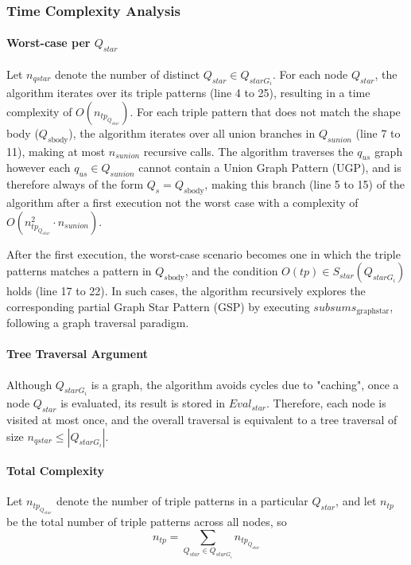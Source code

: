 \subsubsection{Time Complexity Analysis}

\paragraph{Worst-case per $Q_{star}$}
Let $n_{qstar}$ denote the number of distinct $Q_{star} \in Q_{starG_i}$.
For each node $Q_{star}$, the algorithm iterates over its triple patterns (line 4 to 25), resulting in a time complexity of $O(n_{tp_{Q_{star}}})$.
For each triple pattern that does not match the shape body ($Q_{s\mathrm{body}}$), the algorithm iterates over all union branches in $Q_{sunion}$ (line 7 to 11), making at most $n_{sunion}$ recursive calls.
The algorithm traverses the $q_{us}$ graph however each $q_{us} \in Q_{sunion}$ cannot contain a Union Graph Pattern (UGP), and is therefore always of the form $Q_s = Q_{s\mathrm{body}}$, making this 
branch (line 5 to 15) of the algorithm after a first execution not the worst case with a complexity of $O(n_{tp_{Q_{star}}}^{2} \cdot n_{sunion})$.

After the first execution, the worst-case scenario becomes one in which the triple patterns matches a pattern in $Q_{s\mathrm{body}}$, and the condition $O(tp) \in S_{star}(Q_{starG_i})$ holds (line 17 to 22).
In such cases, the algorithm recursively explores the corresponding partial Graph Star Pattern (GSP) by executing $subsums_{\mathrm{graph star}}$, following a graph traversal paradigm.


\paragraph{Tree Traversal Argument}
Although $Q_{starG_i}$ is a graph, the algorithm avoids cycles due to "caching", once a node $Q_{star}$ is evaluated, its result is stored in $Eval_{star}$.
Therefore, each node is visited at most once, and the overall traversal is equivalent to a tree traversal of size $n_{qstar} \leq |Q_{starG_i}|$.

\paragraph{Total Complexity}
Let $n_{tp_{Q_{star}}}$ denote the number of triple patterns in a particular $Q_{star}$, and let $n_{tp}$ be the total number of triple patterns across all nodes, so
$$
n_{tp} = \sum_{Q_{star} \in Q_{starG_i}} n_{tp_{Q_{star}}}
$$

